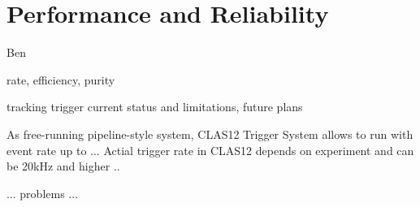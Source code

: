 \section{Performance and Reliability} Ben

rate, efficiency, purity

tracking trigger current status and limitations, future plans



As free-running pipeline-style system, CLAS12 Trigger System allows to run with event rate up to ...
Actial trigger rate in CLAS12 depends on experiment and can be 20kHz and higher ..

... problems ...